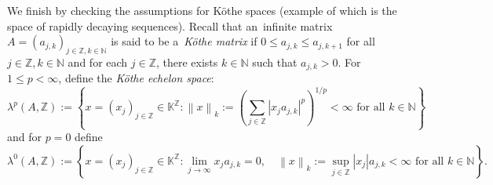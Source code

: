 \documentclass[11pt,a4paper]{amsart}
\theoremstyle{definition}
\newcommand{\Z}{\mathbb{Z}}
\newcommand{\N}{\mathbb{N}}
\newcommand{\K}{\mathbb{K}}
\newcommand{\abs}[1]{\left| #1 \right|}
\newcommand{\norm}[1]{\left\| #1 \right\|}
\begin{document}
	We finish by checking the assumptions for K\"othe spaces (example of which is the space of rapidly decaying sequences). Recall that an~infinite matrix \( A = (a_{j,k})_{j \in \Z,k \in \mathbb{N}} \) is said to be a~\emph{K\"othe matrix} if $0 \leq a_{j,k} \leq a_{j,k+1}$ for all $j \in \Z,k \in \N$ and for each $j \in \Z$, there exists $k \in \N$ such that $a_{j,k} > 0$. For $1 \leq p < \infty$, define the \emph{K\"othe echelon space}:
	\begin{equation*}
		\lambda^p(A, \Z) := \left\{ x = (x_j)_{j\in\Z} \in \K^\Z : 
		\norm{x}_k := \left( \sum_{j\in\Z} \abs{x_j a_{j,k}}^p \right)^{1/p} < \infty \text{ for all } k \in \N \right\}
	\end{equation*}
	and for $p = 0$ define
	\begin{equation*}
		\lambda^0(A, \Z) := \left\{ x = (x_j)_{j\in\Z} \in \K^\Z : 
		\lim_{j \to \infty} x_j a_{j,k} = 0, \quad 
		\norm{x}_k := \sup_{j \in \Z} \abs{x_j} a_{j,k} < \infty \text{ for all } k \in \N \right\}.
	\end{equation*}
	
\end{document}
